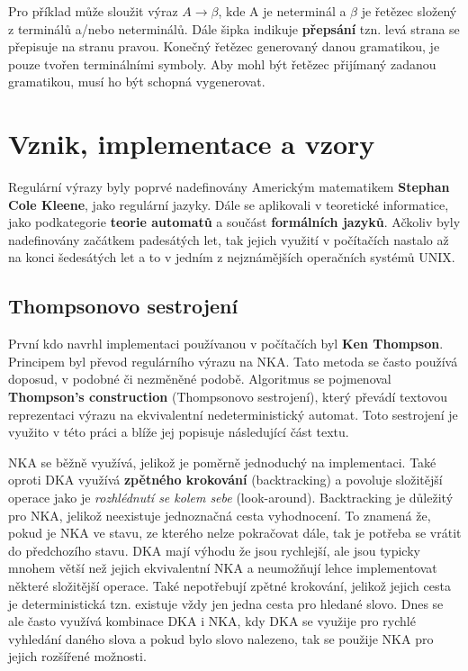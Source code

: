 Pro příklad může sloužit výraz $A \longrightarrow \beta$, kde A je neterminál a $\beta$ je řetězec složený z terminálů a/nebo neterminálů. 
Dále šipka indikuje \textbf{přepsání} tzn. levá strana se přepisuje na stranu pravou.
Konečný řetězec generovaný danou gramatikou, je pouze tvořen terminálními symboly.
Aby mohl být řetězec přijímaný zadanou gramatikou, musí ho být schopná vygenerovat.

\section{Vznik, implementace a vzory}
Regulární výrazy byly poprvé nadefinovány Americkým matematikem \textbf{Stephan Cole Kleene}, jako regulární jazyky. 
Dále se aplikovali v teoretické informatice, jako podkategorie \textbf{teorie automatů} a součást \textbf{formálních jazyků}.
Ačkoliv byly nadefinovány začátkem padesátých let, tak jejich využití v počítačích nastalo až na konci šedesátých let a to v 
jedním z nejznámějších operačních systémů UNIX.

\subsection*{Thompsonovo sestrojení}

První kdo navrhl implementaci používanou v počítačích byl \textbf{Ken Thompson}.
Principem byl převod regulárního výrazu na NKA.
Tato metoda se často používá doposud, v podobné či nezměněné podobě.
Algoritmus se pojmenoval \textbf{Thompson's construction} (Thompsonovo sestrojení), který převádí textovou reprezentaci výrazu na ekvivalentní nedeterministický automat.
Toto sestrojení je využito v této práci a blíže jej popisuje následující část textu.

NKA se běžně využívá, jelikož je poměrně jednoduchý na implementaci.
Také oproti DKA využívá \textbf{zpětného krokování} (backtracking) a povoluje složitější operace jako je \textit{rozhlédnutí se kolem sebe} (look-around).
Backtracking je důležitý pro NKA, jelikož neexistuje jednoznačná cesta vyhodnocení.
To znamená že, pokud je NKA ve stavu, ze kterého nelze pokračovat dále, tak je potřeba se vrátit do předchozího stavu.
DKA mají výhodu že jsou rychlejší, ale jsou typicky mnohem větší než jejich ekvivalentní NKA a neumožňují lehce implementovat některé složitější operace.
Také nepotřebují zpětné krokování, jelikož jejich cesta je deterministická tzn. existuje vždy jen jedna cesta pro hledané slovo.
Dnes se ale často využívá kombinace DKA i NKA, kdy DKA se využije pro rychlé vyhledání daného slova a pokud bylo slovo nalezeno, 
tak se použije NKA pro jejich rozšířené možnosti.

